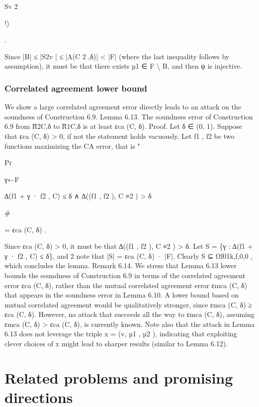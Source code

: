 \documentclass[11pt]{article}
\begin{document}
Sv
2

!)

.

Since |B| ≤ |S2v | ≤ |Λ(C 2 ,δ)| < |F| (where the last inequality follows by assumption), it must be
that there exists µ1 ∈ F \textbackslash{} B, and then ψ is injective.


\subsubsection{Correlated agreement lower bound}



We show a large correlated agreement error directly leads to an attack on the soundness of Construction 6.9.
Lemma 6.13. The soundness error of Construction 6.9 from R̃2C,δ to R̃1C,δ is at least εca (C, δ).
Proof. Let δ ∈ (0, 1). Suppose that εca (C, δ) > 0, if not the statement holds vacuously. Let f1 , f2
be two functions maximizing the CA error, that is
"

Pr

γ←F

∆(f1 + γ · f2 , C) ≤ δ
∧ ∆((f1 , f2 ), C ≡2 ) > δ

\#

= εca (C, δ) .

Since εca (C, δ) > 0, it must be that ∆((f1 , f2 ), C ≡2 ) > δ. Let S = \{γ : ∆(f1 + γ · f2 , C) ≤ δ\}, and
2
note that |S| = εca (C, δ) · |F|. Clearly S ⊆ Ωf01k,f,0,0
, which concludes the lemma.
Remark 6.14. We stress that Lemma 6.13 lower bounds the soundness of Construction 6.9 in
terms of the correlated agreement error εca (C, δ), rather than the mutual correlated agreement error
εmca (C, δ) that appears in the soundness error in Lemma 6.10. A lower bound based on mutual
correlated agreement would be qualitatively stronger, since εmca (C, δ) ≥ εca (C, δ). However, no
attack that succeeds all the way to εmca (C, δ), assuming εmca (C, δ) > εca (C, δ), is currently known.
Note also that the attack in Lemma 6.13 does not leverage the triple x = (v, µ1 , µ2 ), indicating that
exploiting clever choices of x might lead to sharper results (similar to Lemma 6.12).


\section{Related problems and promising directions}
\end{document}
